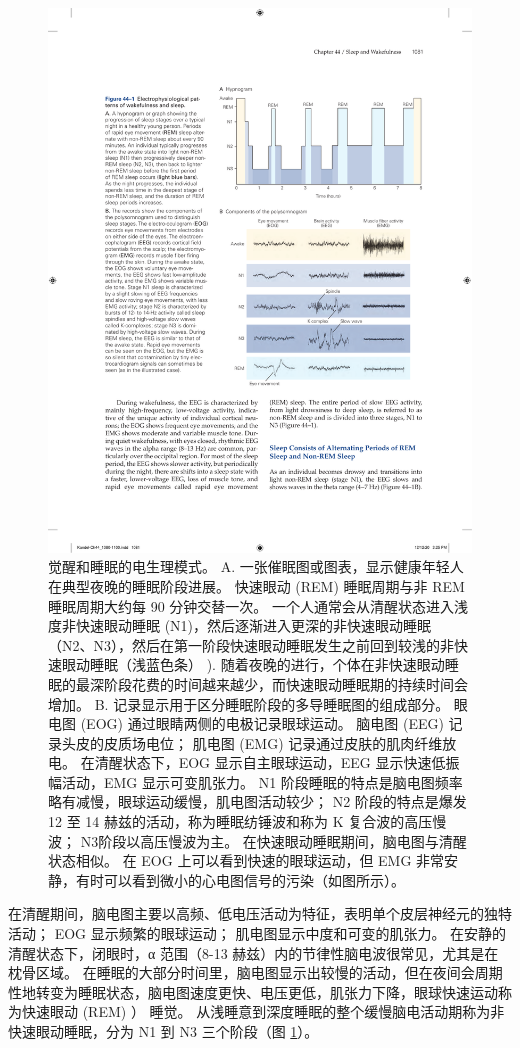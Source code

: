 \begin{figure}[htbp]
	\centering
	\includegraphics[width=0.7\linewidth]{chap44/fig_44_1}
	\caption{觉醒和睡眠的电生理模式。 A. 一张催眠图或图表，显示健康年轻人在典型夜晚的睡眠阶段进展。 快速眼动 (REM) 睡眠周期与非 REM 睡眠周期大约每 90 分钟交替一次。 一个人通常会从清醒状态进入浅度非快速眼动睡眠 (N1)，然后逐渐进入更深的非快速眼动睡眠（N2、N3），然后在第一阶段快速眼动睡眠发生之前回到较浅的非快速眼动睡眠（浅蓝色条） ). 随着夜晚的进行，个体在非快速眼动睡眠的最深阶段花费的时间越来越少，而快速眼动睡眠期的持续时间会增加。 B. 记录显示用于区分睡眠阶段的多导睡眠图的组成部分。 眼电图 (EOG) 通过眼睛两侧的电极记录眼球运动。 脑电图 (EEG) 记录头皮的皮质场电位； 肌电图 (EMG) 记录通过皮肤的肌肉纤维放电。 在清醒状态下，EOG 显示自主眼球运动，EEG 显示快速低振幅活动，EMG 显示可变肌张力。 N1 阶段睡眠的特点是脑电图频率略有减慢，眼球运动缓慢，肌电图活动较少； N2 阶段的特点是爆发 12 至 14 赫兹的活动，称为睡眠纺锤波和称为 K 复合波的高压慢波； N3阶段以高压慢波为主。 在快速眼动睡眠期间，脑电图与清醒状态相似。 在 EOG 上可以看到快速的眼球运动，但 EMG 非常安静，有时可以看到微小的心电图信号的污染（如图所示）。}
	\label{fig:44_1}
\end{figure}


在清醒期间，脑电图主要以高频、低电压活动为特征，表明单个皮层神经元的独特活动；
EOG 显示频繁的眼球运动；
肌电图显示中度和可变的肌张力。
在安静的清醒状态下，闭眼时，α 范围（8-13 赫兹）内的节律性脑电波很常见，尤其是在枕骨区域。
在睡眠的大部分时间里，脑电图显示出较慢的活动，但在夜间会周期性地转变为睡眠状态，脑电图速度更快、电压更低，肌张力下降，眼球快速运动称为快速眼动 (REM) ） 睡觉。
从浅睡意到深度睡眠的整个缓慢脑电活动期称为非快速眼动睡眠，分为 N1 到 N3 三个阶段（图 \ref{fig:44_1}）。



